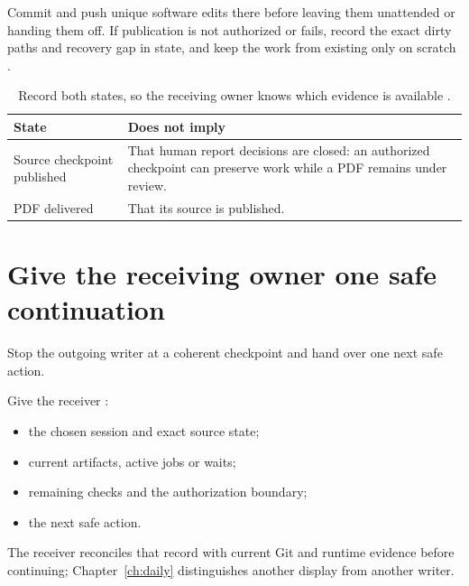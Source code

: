 \begin{rulebox}
  Commit and push unique software edits
  there before leaving them unattended or handing them off. If publication is not authorized
  or fails, record the exact dirty paths and recovery gap in state, and keep the work from
  existing only on scratch \cite[Commit and hand off]{skill:git}.
\end{rulebox}

\begin{table}[H]
  \small
  \begin{tabularx}{\textwidth}{L{0.3\textwidth}Y}
    \toprule
    State & Does not imply \\
    \midrule
    Source checkpoint published & That human report decisions are closed: an authorized
    checkpoint can preserve work while a PDF remains under review. \\
    PDF delivered & That its source is published. \\
    \bottomrule
  \end{tabularx}
  \caption{Record both states, so the receiving owner knows which evidence is available
    \cites[Commit and hand off]{skill:git}[Review and release]{skill:report-production}.}
  \label{tab:handoff-states}
\end{table}

\section{Give the receiving owner one safe continuation}

\begin{headline}
  Stop the outgoing writer at a coherent checkpoint and hand over one next safe action.
\end{headline}

Give the receiver \cite[Routine continuation and client changes]{skill:recovery}:
\begin{itemize}
  \item the chosen session and exact source state;
  \item current artifacts, active jobs or waits;
  \item remaining checks and the authorization boundary;
  \item the next safe action.
\end{itemize}
The receiver reconciles that record with current Git and runtime evidence before
continuing; Chapter~\ref{ch:daily} distinguishes another display from another writer.

